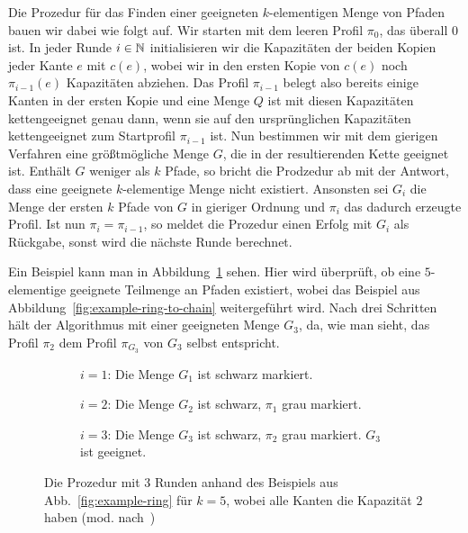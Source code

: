 Die Prozedur für das Finden einer geeigneten $k$-elementigen Menge von Pfaden bauen wir dabei wie folgt auf.
Wir starten mit dem leeren Profil $\pi_0$, das überall 0 ist.
In jeder Runde $i \in \mathbb N$ initialisieren wir die Kapazitäten der beiden Kopien jeder Kante $e$ mit $c(e)$, wobei wir
in den ersten Kopie von $c(e)$ noch $\pi_{i-1}(e)$ Kapazitäten abziehen.
Das Profil $\pi_{i-1}$ belegt also bereits einige Kanten in der ersten Kopie und eine Menge $Q$ ist mit diesen Kapazitäten
kettengeeignet genau dann, wenn sie auf den ursprünglichen Kapazitäten kettengeeignet zum Startprofil $\pi_{i-1}$ ist.
Nun bestimmen wir mit dem gierigen Verfahren eine größtmögliche Menge $G$, die in der resultierenden Kette
geeignet ist.
Enthält $G$ weniger als $k$ Pfade, so bricht die Prodzedur ab mit der Antwort, dass eine geeignete $k$-elementige Menge
nicht existiert.
Ansonsten sei $G_i$ die Menge der ersten $k$ Pfade von $G$ in gieriger Ordnung und $\pi_{i}$ das dadurch erzeugte
Profil.
Ist nun $\pi_i = \pi_{i-1}$, so meldet die Prozedur einen Erfolg mit $G_i$ als Rückgabe, sonst wird die nächste Runde
berechnet.

Ein Beispiel kann man in Abbildung~\ref{fig:example-ring-procedure} sehen.
Hier wird überprüft, ob eine $5$-elementige geeignete Teilmenge an Pfaden existiert, wobei
das Beispiel aus Abbildung~\ref{fig:example-ring-to-chain} weitergeführt wird.
Nach drei Schritten hält der Algorithmus mit einer geeigneten Menge $G_3$, da, wie man sieht, das Profil $\pi_2$
dem Profil $\pi_{G_3}$ von $G_3$ selbst entspricht.

\begin{figure}[h]
	\begin{subfigure}{\textwidth}
		\centering
		\def\svgwidth{230bp}
		
		\caption{$i=1$: Die Menge $G_1$ ist schwarz markiert.}
	\end{subfigure}
	\begin{subfigure}{\textwidth}
		\centering
		\def\svgwidth{230bp}
		
		\caption{$i=2$: Die Menge $G_2$ ist schwarz, $\pi_1$ grau markiert.}
	\end{subfigure}
	\begin{subfigure}{\textwidth}
		\centering
		\def\svgwidth{230bp}
		
		\caption{$i=3$: Die Menge $G_3$ ist schwarz, $\pi_2$ grau markiert. $G_3$ ist geeignet.}
	\end{subfigure}
	\caption{Die Prozedur mit 3 Runden anhand des Beispiels aus Abb.~\ref{fig:example-ring} für $k=5$, wobei alle Kanten die Kapazität $2$ haben (mod. nach~\cite{paper})}
	\label{fig:example-ring-procedure}
\end{figure}


